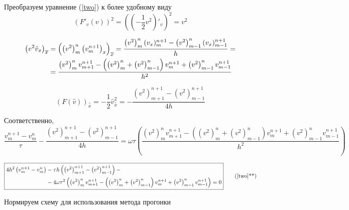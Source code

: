 Преобразуем уравнение (\ref{two}) к более удобному виду
\[
\left(F'_v(v)\right)^2 = \left(\left(-\frac{1}{2}v^2\right)'_v \right)^2 = v^2	
\]

\begin{equation} \notag
\begin{split}
\left(v^2\hat{v}_x\right)_{\overline{x}} &= 
\left(\left(v^2\right)_{m}^{n}\left(v_{m}^{n+1}\right)_x\right)_{\overline{x}} = 
\frac{\left(v^2\right)_{m}^{n}(v_x)_{m}^{n+1} - \left(v^2\right)_{m-1}^{n}(v_x)_{m-1}^{n+1}}{h} = \\ 
&= \frac{\left(v^2\right)_{m}^{n}v_{m+1}^{n+1} 
- \left(\left(v^2\right)_{m}^{n} + \left(v^2\right)_{m-1}^{n}\right)v_{m}^{n+1} 
+ \left(v^2\right)_{m-1}^{n}v_{m-1}^{n+1}}{h^2} 
\end{split}
\end{equation}

\[
(F(\hat{v}))_{ \overset{\circ}{x} } = 
-\frac{1}{2}\hat{v}_{ \overset{\circ}{x}}^2 =
-\frac{\left(v^2\right)_{m+1}^{n+1} - \left(v^2\right)_{m-1}^{n+1}}{4h}
\]

Соответственно,
\[
\frac{v_{m}^{n+1} - v_m^n}{\tau}  -\frac{\left(v^2\right)_{m+1}^{n+1} - \left(v^2\right)_{m-1}^{n+1}}{4h} = \omega \tau \left(\frac{\left(v^2\right)_{m}^{n}v_{m+1}^{n+1} 
- \left(\left(v^2\right)_{m}^{n} + \left(v^2\right)_{m-1}^{n}\right)v_{m}^{n+1} 
+ \left(v^2\right)_{m-1}^{n}v_{m-1}^{n+1}}{h^2}  
\right)
\]

\begin{equation} \label{two2}
\boxed{
\begin{split}
4h^2\left( v_{m}^{n+1} - v_m^n \right) &-
\tau h\left(\left(v^2\right)_{m+1}^{n+1} - \left(v^2\right)_{m-1}^{n+1}\right) - \\
&- 4 \omega \tau^2 \left(\left(v^2\right)_{m}^{n}v_{m+1}^{n+1} 
- \left(\left(v^2\right)_{m}^{n} + \left(v^2\right)_{m-1}^{n}\right)v_{m}^{n+1} 
+ \left(v^2\right)_{m-1}^{n}v_{m-1}^{n+1}\right)
 = 0
\end{split}
}
\tag{\ref{two}**}
\end{equation}



Нормируем схему для использования метода прогонки

